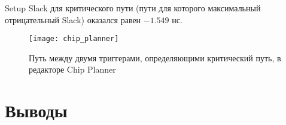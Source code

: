 Setup Slack для критического пути (пути для которого максимальный отрицательный Slack) оказался равен $-1.549$ нс.

\begin{figure}[H]
\begin{center}
	\texttt{[image: chip\_planner]}
	\caption{Путь между двумя триггерами, определяющими критический путь, в редакторе Chip Planner}
	\label{fig:chip_planner}
\end{center}
\end{figure}

\section{Выводы}

